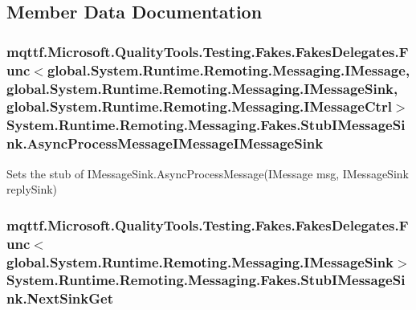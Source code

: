 \subsection{Member Data Documentation}
\hypertarget{class_system_1_1_runtime_1_1_remoting_1_1_messaging_1_1_fakes_1_1_stub_i_message_sink_a9e131d128768630fcbf1233d90e49f64}{
\subsubsection[{Async\-Process\-Message\-I\-Message\-I\-Message\-Sink}]{\setlength{\rightskip}{0pt plus 5cm}mqttf.\-Microsoft.\-Quality\-Tools.\-Testing.\-Fakes.\-Fakes\-Delegates.\-Func$<$global.\-System.\-Runtime.\-Remoting.\-Messaging.\-I\-Message, global.\-System.\-Runtime.\-Remoting.\-Messaging.\-I\-Message\-Sink, global.\-System.\-Runtime.\-Remoting.\-Messaging.\-I\-Message\-Ctrl$>$ System.\-Runtime.\-Remoting.\-Messaging.\-Fakes.\-Stub\-I\-Message\-Sink.\-Async\-Process\-Message\-I\-Message\-I\-Message\-Sink}}\label{class_system_1_1_runtime_1_1_remoting_1_1_messaging_1_1_fakes_1_1_stub_i_message_sink_a9e131d128768630fcbf1233d90e49f64}


Sets the stub of I\-Message\-Sink.\-Async\-Process\-Message(\-I\-Message msg, I\-Message\-Sink reply\-Sink)

\hypertarget{class_system_1_1_runtime_1_1_remoting_1_1_messaging_1_1_fakes_1_1_stub_i_message_sink_a53762246c31a28ffc99eb089a4f33421}{
\subsubsection[{Next\-Sink\-Get}]{\setlength{\rightskip}{0pt plus 5cm}mqttf.\-Microsoft.\-Quality\-Tools.\-Testing.\-Fakes.\-Fakes\-Delegates.\-Func$<$global.\-System.\-Runtime.\-Remoting.\-Messaging.\-I\-Message\-Sink$>$ System.\-Runtime.\-Remoting.\-Messaging.\-Fakes.\-Stub\-I\-Message\-Sink.\-Next\-Sink\-Get}}\label{class_system_1_1_runtime_1_1_remoting_1_1_messaging_1_1_fakes_1_1_stub_i_message_sink_a53762246c31a28ffc99eb089a4f33421}



